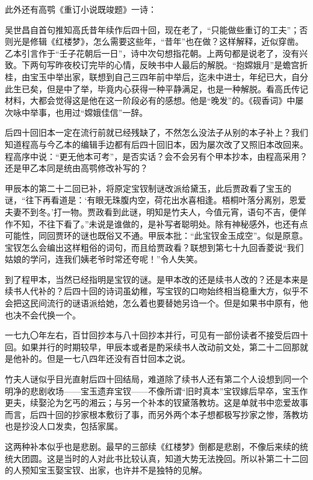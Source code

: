 \par 此外还有高鹗《重订小说既竣题》一诗：
\par 吴世昌自首句推知高氏昔年续作后四十回，现在老了，“只能做些重订的工夫”；否则光是修辑《红楼梦》，怎么需要这些年，“昔年”也在做？这样解释，近似穿凿。乙本引言作于“壬子花朝后一日”，诗中次句想指花朝。上两句都是说老了，没有兴致。下两句写昨夜校订完毕的心情，反映书中人最后的解脱。“抱嫦娥月”是蟾宫折桂，由宝玉中举出家，联想到自己三四年前中举后，迄未中进士，年纪已大，自分此生已矣，但是中了举，毕竟内心获得一种平静满足，也是一种解脱。看高氏传记材料，大都会觉得这是他在这一阶段必有的感想。他是“晚发”的。《砚香词》中屡次咏中举事，也用过“嫦娥佳信”一辞。
\par 后四十回旧本一定在流行前就已经残缺了，不然怎么没法子从别的本子补上？我们知道程高与今乙本的编辑手边都有后四十回旧本，因为屡次改了又照旧本改回来。程高序中说：“更无他本可考”，是否实话？会不会另有个甲本抄本，由程高采用？还是甲乙本同是统由高鹗修改补写的？
\par 甲辰本的第二十二回已补，将原定宝钗制谜改派给黛玉，此后贾政看了宝玉的谜，“往下再看道是：‘有眼无珠腹内空，荷花出水喜相逢。梧桐叶落分离别，恩爱夫妻不到冬。’打一物。贾政看到此谜，明知是竹夫人，今值元宵，语句不吉，便佯作不知，不往下看了。”未说是谁做的，是补写者聪明处。除有神秘感外，也还有点可能性，同回贾环的谜也既俗又不通。甲辰本批：“此宝钗金玉成空”。似是原意。宝钗怎么会编出这样粗俗的词句，而且给贾政看？联想到第七十九回香菱说“我们姑娘的学问，连我们姨老爷时常还夸呢！”令人失笑。
\par 到了程甲本，当然已经指明是宝钗的谜。是甲本改的还是续书人改的？还是本来是续书人代补的？后四十回的诗词虽幼稚，写宝钗的口吻始终相当稳重大方，似乎不会把这民间流行的谜语派给她，怎么着也要替她另诌一个。但是如果书中原有，他也决不会代换一个。
\par 一七九〇年左右，百廿回抄本与八十回抄本并行，可见有一部份读者不接受后四十回。如果并行的时期较早，甲辰本或者是酌采续书人改动前文处，第二十二回那就是他补的。但是一七八四年还没有百廿回本之说。
\par 竹夫人谜似乎目光直射后四十回结局，难道除了续书人还有第二个人设想到同一个明净的悲剧收场——宝玉遗弃宝钗——不像所谓“旧时真本”宝钗嫁后早卒，宝玉作更夫，续娶沦为乞丐的湘云；与另一个补本的钗黛落教坊。这是单就书中恋爱故事而言，后四十回的抄家根本敷衍了事，而另外两个本子想都极写抄家之惨，落教坊也是抄没人口发卖，包括家属。
\par 这两种补本似乎也是悲剧。最早的三部续《红楼梦》倒都是悲剧，不像后来续的统统大团圆。这是当时的人对此书比较认真，知道大势无法挽回。所以补第二十二回的人预知宝玉娶宝钗、出家，也许并不是独特的见解。
